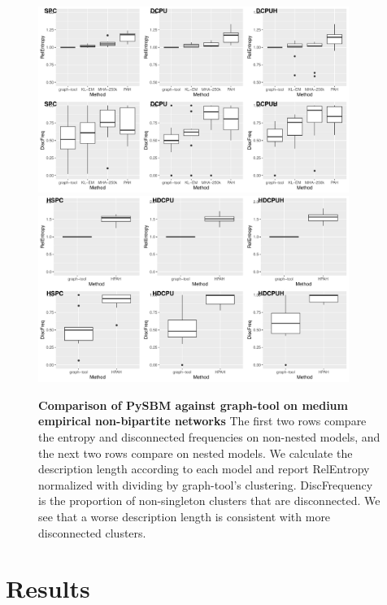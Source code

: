 \documentclass[aps,pre,superscriptaddress]{revtex4}
\begin{document}
\begin{figure}[!htpb]
	\centering
	\includegraphics[width=0.9\textwidth]{figures/pysbm_v_graph_tool_flat.pdf}
	\includegraphics[width=0.9\textwidth]{figures/pysbm_v_graph_tool_nested.pdf}
	\caption[]{
		\textbf{Comparison of PySBM against graph-tool on medium empirical non-bipartite networks}
        The first two rows compare the entropy and disconnected frequencies on non-nested models, and the next two rows compare on nested models.
        We calculate the description length according to each model and report RelEntropy normalized with dividing by graph-tool's clustering.
        DiscFrequency is the proportion of non-singleton clusters that are disconnected.
        We see that a worse description length is consistent with more disconnected clusters.
	}
	\label{fig:comparison_flat.pdf}
\end{figure}
\section{Results}
\end{document}
